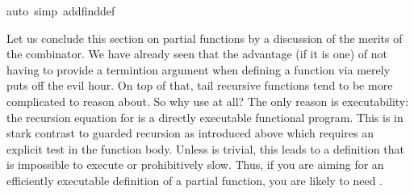 \begin{isabellebody}
auto\ simp\ add{\isacharcolon}find{}{\isacharunderscore}def{\isacharparenright}\isanewline
{}%
\begin{isamarkuptext}%
Let us conclude this section on partial functions by a
discussion of the merits of the  combinator. We have
already seen that the advantage (if it is one) of not having to
provide a termintion argument when defining a function via  merely puts off the evil hour. On top of that, tail recursive
functions tend to be more complicated to reason about. So why use
 at all? The only reason is executability: the recursion
equation for  is a directly executable functional
program. This is in stark contrast to guarded recursion as introduced
above which requires an explicit test  in the
function body.  Unless  is trivial, this leads to a
definition that is impossible to execute or prohibitively slow.
Thus, if you are aiming for an efficiently executable definition
of a partial function, you are likely to need .%
\end{isamarkuptext}%
\end{isabellebody}%
